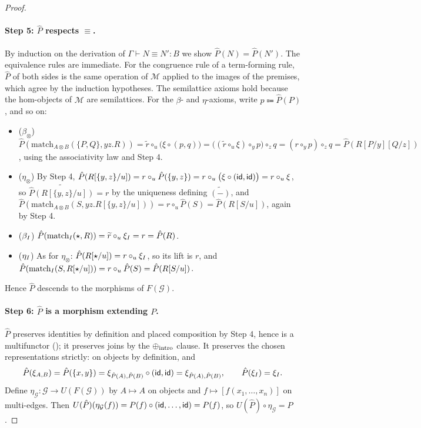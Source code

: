 \begin{proof}
\paragraph{Step 5: $\hat{P}$ respects $\equiv$.}
By induction on the derivation of $\Gamma \vdash N \equiv N' : B$ we show $\hat{P}(N) = \hat{P}(N')$.
The equivalence rules are immediate.
For the congruence rule of a term-forming rule, $\hat{P}$ of both sides is the same operation of $\mathcal{M}$ applied to the images of the premises, which agree by the induction hypotheses.
The semilattice axioms hold because the hom-objects of $\mathcal{M}$ are semilattices.
For the $\beta$- and $\eta$-axioms, write $p \Coloneqq \hat{P}(P)$, and so on:
\begin{itemize}
  \item ($\beta_{\otimes}$)
  $\hat{P}(\text{match}_{A \otimes B}(\{P, Q\}, yz.R))
  = \widetilde{r} \circ_u \bigl( \xi \circ (p, q) \bigr)
  = \bigl( (\widetilde{r} \circ_u \xi) \circ_y p \bigr) \circ_z q
  = (r \circ_y p) \circ_z q
  = \hat{P}(R[P/y][Q/z])$,
  using the associativity law and Step 4.
  \item ($\eta_{\otimes}$) By Step 4, $\hat{P}(R[\{y,z\}/u]) = r \circ_u \hat{P}(\{y,z\}) = r \circ_u \bigl( \xi \circ (\textsf{id}, \textsf{id}) \bigr) = r \circ_u \xi$, so $\widetilde{\hat{P}(R[\{y,z\}/u])} = r$ by the uniqueness defining $\widetilde{(-)}$, and
  $\hat{P}(\text{match}_{A \otimes B}(S, yz.R[\{y,z\}/u])) = r \circ_u \hat{P}(S) = \hat{P}(R[S/u])$, again by Step 4.
  \item ($\beta_{I}$) $\hat{P}(\text{match}_{I}(\star, R)) = \widetilde{r} \circ_u \xi_{I} = r = \hat{P}(R)$.
  \item ($\eta_{I}$) As for $\eta_{\otimes}$: $\hat{P}(R[\star/u]) = r \circ_u \xi_{I}$, so its lift is $r$, and $\hat{P}(\text{match}_{I}(S, R[\star/u])) = r \circ_u \hat{P}(S) = \hat{P}(R[S/u])$.
\end{itemize}
Hence $\hat{P}$ descends to the morphisms of $F(\mathcal{G})$.

\paragraph{Step 6: $\hat{P}$ is a morphism extending $P$.}
$\hat{P}$ preserves identities by definition and placed composition by Step 4, hence is a multifunctor (); it preserves joins by the $\mathbin{\oplus}_{\text{intro}}$ clause.
It preserves the chosen representations strictly: on objects by definition, and
\[
\hat{P}(\xi_{A,B}) = \hat{P}(\{x, y\}) = \xi_{\hat{P}(A), \hat{P}(B)} \circ (\textsf{id}, \textsf{id}) = \xi_{\hat{P}(A), \hat{P}(B)}, \qquad \hat{P}(\xi_{I}) = \xi_{I}.
\]
Define $\eta_{\mathcal{G}} : \mathcal{G} \to U(F(\mathcal{G}))$ by $A \mapsto A$ on objects and $f \mapsto [f(x_1, \ldots, x_n)]$ on multi-edges.
Then $U(\hat{P})(\eta_{\mathcal{G}}(f)) = P(f) \circ (\textsf{id}, \ldots, \textsf{id}) = P(f)$, so $U(\hat{P}) \circ \eta_{\mathcal{G}} = P$.


\end{proof}
